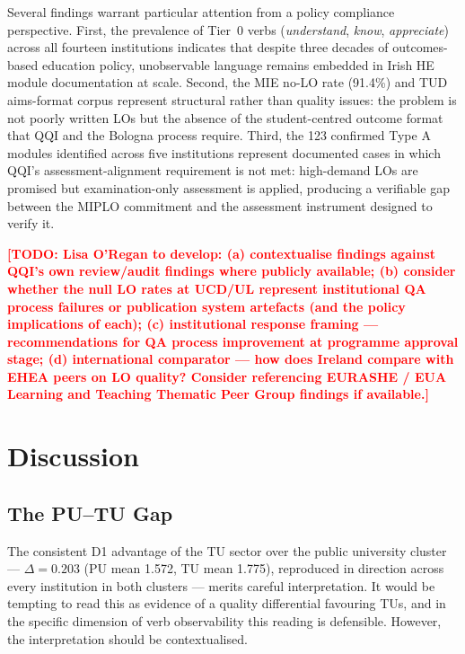 \documentclass[12pt, a4paper]{article}
\newcommand{\todo}[1]{\textcolor{red}{\textbf{[TODO: #1]}}}
\begin{document}
Several findings warrant particular attention from a policy compliance perspective.
First, the prevalence of Tier~0 verbs (\textit{understand}, \textit{know},
\textit{appreciate}) across all fourteen institutions indicates that despite
three decades of outcomes-based education policy, unobservable language remains
embedded in Irish HE module documentation at scale. Second, the MIE no-LO rate
(91.4\%) and TUD aims-format corpus represent structural rather than quality
issues: the problem is not poorly written LOs but the absence of the
student-centred outcome format that QQI and the Bologna process require. Third,
the 123 confirmed Type A modules identified across five institutions represent
documented cases in which QQI's assessment-alignment requirement is not met:
high-demand LOs are promised but examination-only assessment is applied,
producing a verifiable gap between the MIPLO commitment and the assessment
instrument designed to verify it.

\todo{Lisa O'Regan to develop: (a) contextualise findings against QQI's own
review/audit findings where publicly available; (b) consider whether the null
LO rates at UCD/UL represent institutional QA process failures or publication
system artefacts (and the policy implications of each); (c) institutional
response framing — recommendations for QA process improvement at programme
approval stage; (d) international comparator — how does Ireland compare with
EHEA peers on LO quality? Consider referencing EURASHE / EUA Learning and
Teaching Thematic Peer Group findings if available.}

\section{Discussion}
\label{sec:discussion}

\subsection{The PU--TU Gap}

The consistent D1 advantage of the TU sector over the public university cluster ---
$\Delta = 0.203$ (PU mean 1.572, TU mean 1.775), reproduced in direction across every
institution in both clusters --- merits careful interpretation.
It would be tempting to read this as evidence of a quality differential favouring TUs,
and in the specific dimension of verb observability this reading is defensible.
However, the interpretation should be contextualised.
\end{document}
